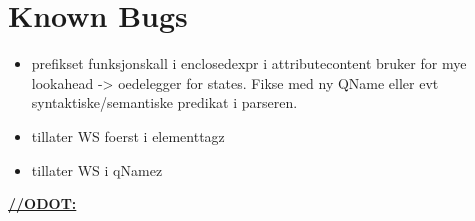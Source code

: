 \section{Known Bugs}
\label{sect:future:knownBugs}
\begin{itemize}
		\item prefikset funksjonskall i enclosedexpr i attributecontent bruker for mye lookahead -> oedelegger for states. Fikse med ny QName eller evt syntaktiske/semantiske predikat i parseren.
		\item tillater WS foerst i elementtagz
		\item tillater WS i qNamez
	\end{itemize}

\underline{\textbf{\LARGE //ODOT:}}
